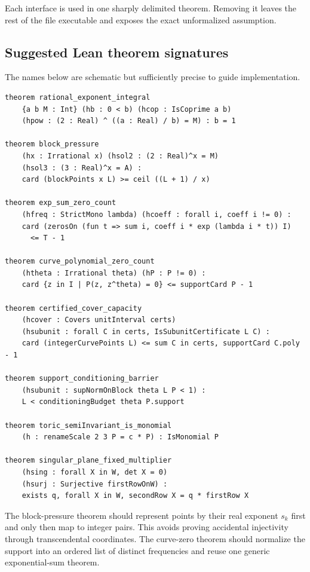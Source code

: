 \documentclass[11pt,oneside]{article}
\theoremstyle{definition}
\theoremstyle{remark}
\begin{document}
Each interface is used in one sharply delimited theorem.  Removing it leaves the rest of the file
executable and exposes the exact unformalized assumption.

\subsection{Suggested Lean theorem signatures}

The names below are schematic but sufficiently precise to guide implementation.

\begin{lstlisting}[style=pseudostyle]
theorem rational_exponent_integral
    {a b M : Int} (hb : 0 < b) (hcop : IsCoprime a b)
    (hpow : (2 : Real) ^ ((a : Real) / b) = M) : b = 1

theorem block_pressure
    (hx : Irrational x) (hsol2 : (2 : Real)^x = M)
    (hsol3 : (3 : Real)^x = A) :
    card (blockPoints x L) >= ceil ((L + 1) / x)

theorem exp_sum_zero_count
    (hfreq : StrictMono lambda) (hcoeff : forall i, coeff i != 0) :
    card (zerosOn (fun t => sum i, coeff i * exp (lambda i * t)) I)
      <= T - 1

theorem curve_polynomial_zero_count
    (htheta : Irrational theta) (hP : P != 0) :
    card {z in I | P(z, z^theta) = 0} <= supportCard P - 1

theorem certified_cover_capacity
    (hcover : Covers unitInterval certs)
    (hsubunit : forall C in certs, IsSubunitCertificate L C) :
    card (integerCurvePoints L) <= sum C in certs, supportCard C.poly - 1

theorem support_conditioning_barrier
    (hsubunit : supNormOnBlock theta L P < 1) :
    L < conditioningBudget theta P.support

theorem toric_semiInvariant_is_monomial
    (h : renameScale 2 3 P = c * P) : IsMonomial P

theorem singular_plane_fixed_multiplier
    (hsing : forall X in W, det X = 0)
    (hsurj : Surjective firstRowOnW) :
    exists q, forall X in W, secondRow X = q * firstRow X
\end{lstlisting}

The block-pressure theorem should represent points by their real exponent $s_k$ first and only
then map to integer pairs.  This avoids proving accidental injectivity through transcendental
coordinates.  The curve-zero theorem should normalize the support into an ordered list of distinct
frequencies and reuse one generic exponential-sum theorem.
\end{document}
